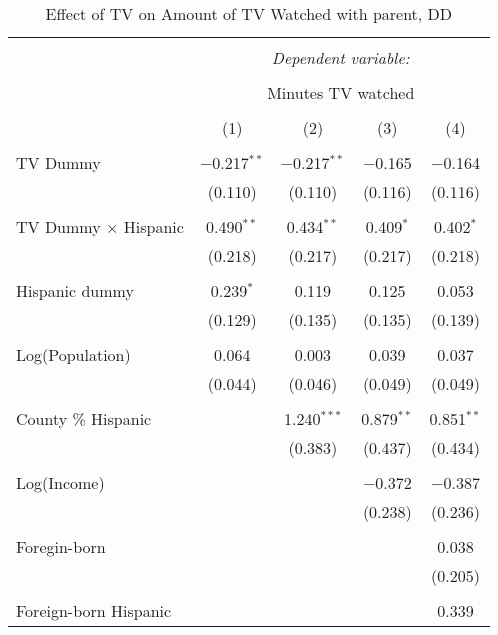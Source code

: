 
\begin{table}[!htbp] \centering 
  \caption{Effect of TV on Amount of TV Watched with parent, DD} 
  \label{} 
\begin{tabular}{@{\extracolsep{-5pt}}lcccc} 
\\[-1.8ex]\hline 
\hline \\[-1.8ex] 
 & \multicolumn{4}{c}{\textit{Dependent variable:}} \\ 
\cline{2-5} 
\\[-1.8ex] & \multicolumn{4}{c}{Minutes TV watched} \\ 
\\[-1.8ex] & (1) & (2) & (3) & (4)\\ 
\hline \\[-1.8ex] 
 TV Dummy & $-$0.217$^{**}$ & $-$0.217$^{**}$ & $-$0.165 & $-$0.164 \\ 
  & (0.110) & (0.110) & (0.116) & (0.116) \\ 
  & & & & \\ 
 TV Dummy $\times$ Hispanic  & 0.490$^{**}$ & 0.434$^{**}$ & 0.409$^{*}$ & 0.402$^{*}$ \\ 
  & (0.218) & (0.217) & (0.217) & (0.218) \\ 
  & & & & \\ 
 Hispanic dummy & 0.239$^{*}$ & 0.119 & 0.125 & 0.053 \\ 
  & (0.129) & (0.135) & (0.135) & (0.139) \\ 
  & & & & \\ 
 Log(Population) & 0.064 & 0.003 & 0.039 & 0.037 \\ 
  & (0.044) & (0.046) & (0.049) & (0.049) \\ 
  & & & & \\ 
 County \% Hispanic &  & 1.240$^{***}$ & 0.879$^{**}$ & 0.851$^{**}$ \\ 
  &  & (0.383) & (0.437) & (0.434) \\ 
  & & & & \\ 
 Log(Income) &  &  & $-$0.372 & $-$0.387 \\ 
  &  &  & (0.238) & (0.236) \\ 
  & & & & \\ 
 Foregin-born &  &  &  & 0.038 \\ 
  &  &  &  & (0.205) \\ 
  & & & & \\ 
 Foreign-born Hispanic &  &  &  & 0.339 \\ 

\end{tabular}
\end{table}
